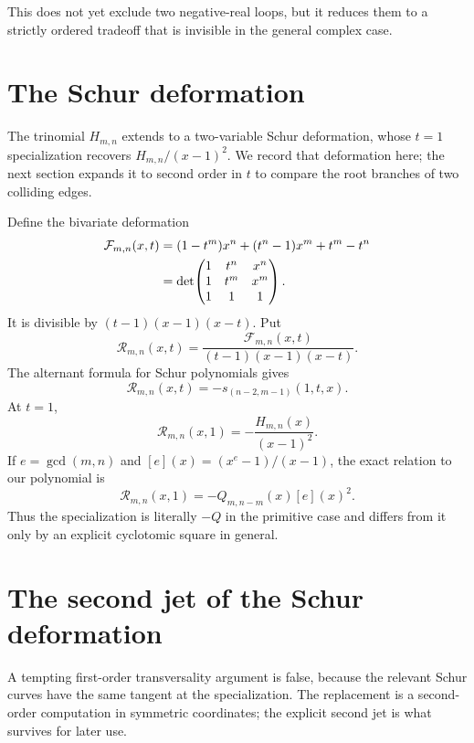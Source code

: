 \documentclass[11pt]{article}
\numberwithin{equation}{section}
\theoremstyle{definition}
\begin{document}
This does not yet exclude two negative-real loops, but it reduces them to a
strictly ordered tradeoff that is invisible in the general complex case.

\section{The Schur deformation}
\label{sec:schur}

The trinomial \(H_{m,n}\) extends to a two-variable Schur deformation, whose
\(t=1\) specialization recovers \(H_{m,n}/(x-1)^2\).  We record that
deformation here; the next section expands it to second order in \(t\) to
compare the root branches of two colliding edges.

Define the bivariate deformation
\begin{align}
 \mathcal F_{m,n}(x,t)
 &=(1-t^m)x^n+(t^n-1)x^m+t^m-t^n  \notag\\
 &=\det\!\begin{pmatrix}
 1&t^n&x^n\\
 1&t^m&x^m\\
 1&1&1
 \end{pmatrix}.
 \label{eq:8-1}
\end{align}
It is divisible by \((t-1)(x-1)(x-t)\).  Put
\[
 \mathcal R_{m,n}(x,t)=
 \frac{\mathcal F_{m,n}(x,t)}{(t-1)(x-1)(x-t)}.
\]
The alternant formula for Schur polynomials gives
\begin{equation}
 \mathcal R_{m,n}(x,t)
 =-s_{(n-2,m-1)}(1,t,x).
 \label{eq:8-2}
\end{equation}
At \(t=1\),
\begin{equation}
 \mathcal R_{m,n}(x,1)
 =-\frac{H_{m,n}(x)}{(x-1)^2}.
 \label{eq:8-3}
\end{equation}
If \(e=\gcd(m,n)\) and \([e](x)=(x^e-1)/(x-1)\), the exact relation to our
polynomial is
\begin{equation}
 \mathcal R_{m,n}(x,1)
 =-Q_{m,n-m}(x)[e](x)^2.
 \label{eq:8-4}
\end{equation}
Thus the specialization is literally \(-Q\) in the primitive case and differs
from it only by an explicit cyclotomic square in general.

\section{The second jet of the Schur deformation}
\label{sec:secondjet}

A tempting first-order transversality argument is false, because the relevant Schur curves have the same tangent at the specialization.  The replacement is a second-order computation in symmetric coordinates; the explicit second jet is what survives for later use.
\end{document}
